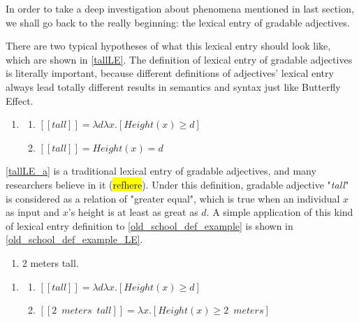 \documentclass{ctexart}
\begin{document}
In order to take a deep investigation about phenomena mentioned in last section, we shall go back to the really beginning: the lexical entry of gradable adjectives. 

There are two typical hypotheses of what this lexical entry should look like, which are shown in \ref{tallLE}. The definition of lexical entry of gradable adjectives is literally important, because different definitions of adjectives' lexical entry always lead totally different results in semantics and syntax just like Butterfly Effect.

\begin{enumerate}[resume]
    \item \label{tallLE}
    
    \begin{enumerate}[ref=(\arabic{enumi}\alph*)]
        \item \label{tallLE_a} 
        $[\![tall]\!]=\lambda d \lambda x.[Height(x) \geq d]$
    
        \item \label{tallLE_b} 
        $[\![tall]\!]=Height(x)=d$
    
    \end{enumerate}
\end{enumerate}

\ref{tallLE_a} is a traditional lexical entry of gradable adjectives, and many researchers believe in it (\colorbox{yellow}{refhere}). Under this definition, gradable adjective "\textit{tall}" is considered as a relation of "greater equal", which is true when an individual $x$ as input and $x$'s height is at least as great as $d$. A simple application of this kind of lexical entry definition to \ref{old_school_def_example} is shown in \ref{old_school_def_example_LE}.

\begin{enumerate}[resume]

    \item \label{old_school_def_example} 2 meters tall.

\end{enumerate}

\begin{enumerate}[resume]

    \item \label{old_school_def_example_LE}
    
    \begin{enumerate}[ref=(\arabic{enumi}\alph*)]
        
        \item $[\![tall]\!]=\lambda d \lambda x.[Height(x) \geq d]$
        \item $[\![2 \enspace meters \enspace tall]\!]=\lambda x.[Height(x) \geq 2 \enspace meters]$

    \end{enumerate}

\end{enumerate}
\end{document}
